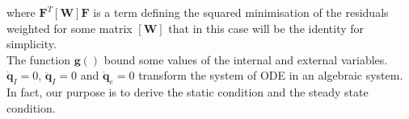 %
where $\mathbf{F}^T [\mathbf{W}] \mathbf{F}$ is a term defining the squared minimisation of the residuals weighted for some matrix $[\mathbf{W}]$ that in this case will be the identity for simplicity.\\
The function $\mathbf{g}()$ bound some values of the internal and external variables.\\
$\dot{\mathbf{q}}_I=0$, $\ddot{\mathbf{q}}_I=0$ and $\dot{\mathbf{q}}_e=0$ transform the system of ODE in an algebraic system. In fact, our purpose is to derive the static condition and the steady state condition.
%